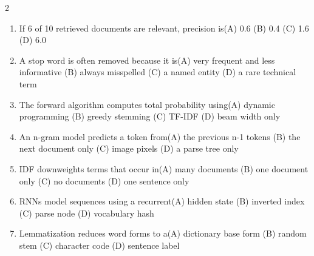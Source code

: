\documentclass[a4paper]{article}
\begin{document}
\begin{multicols*}{2}
\fontsize{8.5}{10}\selectfont
\begin{enumerate}[resume]
\item If 6 of 10 retrieved documents are relevant, precision is\newline\hspace*{0.6em}(A) 0.6 \quad (B) 0.4 \newline\hspace*{0.6em}(C) 1.6 \quad (D) 6.0
\item A stop word is often removed because it is\newline\hspace*{0.6em}(A) very frequent and less informative \quad (B) always misspelled \newline\hspace*{0.6em}(C) a named entity \quad (D) a rare technical term
\item The forward algorithm computes total probability using\newline\hspace*{0.6em}(A) dynamic programming \quad (B) greedy stemming \newline\hspace*{0.6em}(C) TF-IDF \quad (D) beam width only
\item An n-gram model predicts a token from\newline\hspace*{0.6em}(A) the previous n-1 tokens \quad (B) the next document only \newline\hspace*{0.6em}(C) image pixels \quad (D) a parse tree only
\item IDF downweights terms that occur in\newline\hspace*{0.6em}(A) many documents \quad (B) one document only \newline\hspace*{0.6em}(C) no documents \quad (D) one sentence only
\item RNNs model sequences using a recurrent\newline\hspace*{0.6em}(A) hidden state \quad (B) inverted index \newline\hspace*{0.6em}(C) parse node \quad (D) vocabulary hash
\item Lemmatization reduces word forms to a\newline\hspace*{0.6em}(A) dictionary base form \quad (B) random stem \newline\hspace*{0.6em}(C) character code \quad (D) sentence label

\end{enumerate}
\end{multicols*}
\end{document}
